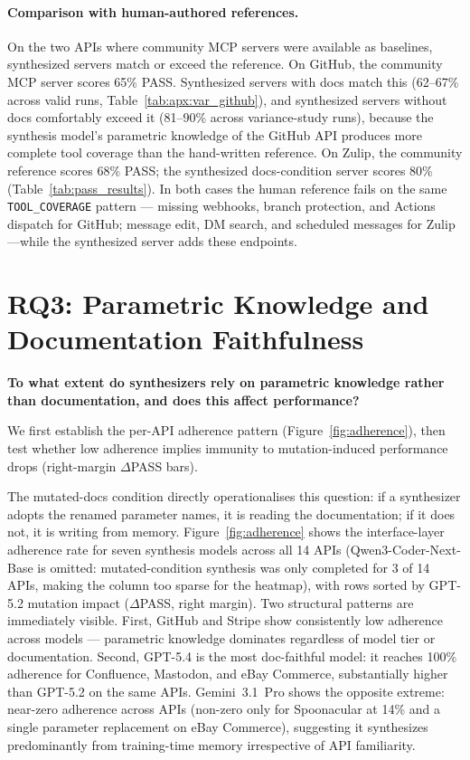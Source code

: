 \paragraph{Comparison with human-authored references.}
On the two APIs where community MCP servers were available as baselines, synthesized servers match or exceed the reference. On GitHub, the community MCP server scores 65\% PASS. Synthesized servers with docs match this (62--67\% across valid runs, Table~\ref{tab:apx:var_github}), and synthesized servers without docs comfortably exceed it (81--90\% across variance-study runs), because the synthesis model's parametric knowledge of the GitHub API produces more complete tool coverage than the hand-written reference. On Zulip, the community reference scores 68\% PASS; the synthesized docs-condition server scores 80\% (Table~\ref{tab:pass_results}). In both cases the human reference fails on the same \texttt{TOOL\_COVERAGE} pattern --- missing webhooks, branch protection, and Actions dispatch for GitHub; message edit, DM search, and scheduled messages for Zulip ---while the synthesized server adds these endpoints.

\section{RQ3: Parametric Knowledge and Documentation Faithfulness}
\label{sec:rq3}

\textbf{To what extent do synthesizers rely on parametric knowledge rather than documentation, and does this affect performance?}

We first establish the per-API adherence pattern (Figure~\ref{fig:adherence}), then test whether low adherence implies immunity to mutation-induced performance drops (right-margin $\Delta$PASS bars).

The mutated-docs condition directly operationalises this question: if a synthesizer adopts the renamed parameter names, it is reading the documentation; if it does not, it is writing from memory. Figure~\ref{fig:adherence} shows the interface-layer adherence rate for seven synthesis models across all 14 APIs (Qwen3-Coder-Next-Base is omitted: mutated-condition synthesis was only completed for 3 of 14 APIs, making the column too sparse for the heatmap), with rows sorted by GPT-5.2 mutation impact ($\Delta$PASS, right margin). Two structural patterns are immediately visible. First, GitHub and Stripe show consistently low adherence across models --- parametric knowledge dominates regardless of model tier or documentation. Second, GPT-5.4 is the most doc-faithful model: it reaches 100\% adherence for Confluence, Mastodon, and eBay Commerce, substantially higher than GPT-5.2 on the same APIs. Gemini~3.1~Pro shows the opposite extreme: near-zero adherence across APIs (non-zero only for Spoonacular at 14\% and a single parameter replacement on eBay Commerce), suggesting it synthesizes predominantly from training-time memory irrespective of API familiarity.

